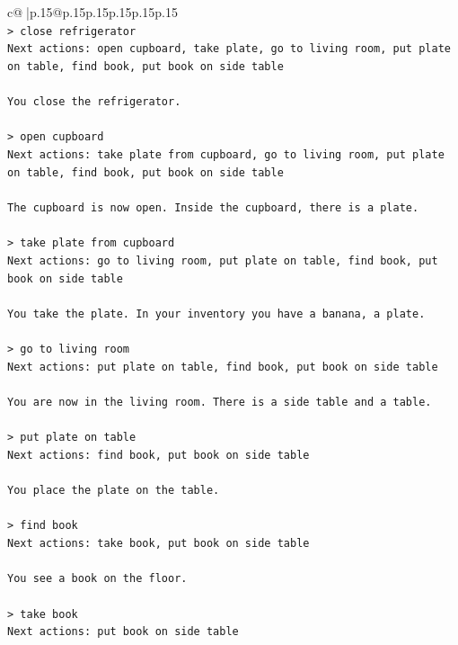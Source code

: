\documentclass{article}
\begin{document}
{\begin{supertabular}{c@{$\;$}|p{.15\linewidth}@{}p{.15\linewidth}p{.15\linewidth}p{.15\linewidth}p{.15\linewidth}p{.15\linewidth}}
{{{\\ 
\texttt{> close refrigerator  } \\
\texttt{Next actions: open cupboard, take plate, go to living room, put plate on table, find book, put book on side table} \\
\\ 
\texttt{You close the refrigerator.} \\
\\ 
\texttt{> open cupboard  } \\
\texttt{Next actions: take plate from cupboard, go to living room, put plate on table, find book, put book on side table} \\
\\ 
\texttt{The cupboard is now open. Inside the cupboard, there is a plate.} \\
\\ 
\texttt{> take plate from cupboard  } \\
\texttt{Next actions: go to living room, put plate on table, find book, put book on side table} \\
\\ 
\texttt{You take the plate. In your inventory you have a banana, a plate.} \\
\\ 
\texttt{> go to living room  } \\
\texttt{Next actions: put plate on table, find book, put book on side table} \\
\\ 
\texttt{You are now in the living room. There is a side table and a table.} \\
\\ 
\texttt{> put plate on table  } \\
\texttt{Next actions: find book, put book on side table} \\
\\ 
\texttt{You place the plate on the table.} \\
\\ 
\texttt{> find book  } \\
\texttt{Next actions: take book, put book on side table} \\
\\ 
\texttt{You see a book on the floor.} \\
\\ 
\texttt{> take book  } \\
\texttt{Next actions: put book on side table} \\
\\ 
}}}
\end{supertabular}}
\end{document}
